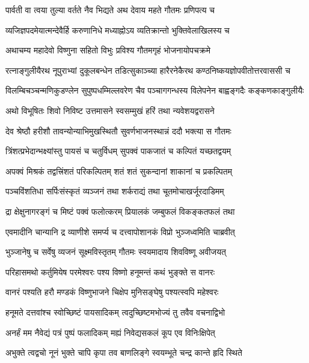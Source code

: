 \twolineshloka
{पार्वती वा त्वया तुल्या वर्तते नैव भिद्यते}
{अथ देवाय महते गौतमः प्रणिपत्य च}%

\twolineshloka
{व्यजिज्ञपदमेयात्मन्देवैर्हि करुणानिधे}
{मध्याह्नोऽय व्यतिक्रान्तो भुक्तिवेलाखिलस्य च}%

\twolineshloka
{अथाचम्य महादेवो विष्णुना सहितो विभुः}
{प्रविश्य गौतमगृहं भोजनायोपचक्रमे}%

\twolineshloka
{रत्नाङ्गुलीयैरथ नूपुराभ्यां दुकूलबन्धेन तडित्सुकाञ्च्या}
{हारैरनेकैरथ कण्ठनिष्कयज्ञोपवीतोत्तरवाससी च}%

\twolineshloka
{विलम्बिचञ्चन्मणिकुडण्लेन सुपुष्पधम्मिल्लवरेण चैव}
{पञ्चागगन्धस्य विलेपनेन बाह्वङ्गदैः कङ्कणकाङ्गुलीयैः}%

\twolineshloka
{अथो विभूषितः शिवो निविष्ट उत्तमासने}
{स्वसम्मुखं हरिं तथा न्यवेशयद्वरासने}%

\twolineshloka
{देव श्रेष्ठौ हरीशौ तावन्योन्याभिमुखस्थितौ}
{सुवर्णभाजनस्थान्नं ददौ भक्त्या स गौतमः}%

\twolineshloka
{त्रिंशत्प्रभेदान्भक्ष्यांस्तु पायसं च चतुर्विधम्}
{सुपक्वं पाकजातं च कल्पितं यच्छतद्वयम्}%

\twolineshloka
{अपक्वं मिश्रकं तद्वत्त्रिंशतं परिकल्पितम्}
{शतं शतं सुकन्दानां शाकानां च प्रकल्पितम्}%

\twolineshloka
{पञ्चविंशतिधा सर्पिःसंस्कृतं व्यञ्जनं तथा}
{शर्कराद्यं तथा चूतमोचाखर्जूरदाडिमम्}%

\twolineshloka
{द्रा क्षेक्षुनागरङ्गं च मिष्टं पक्वं फलोत्करम्}
{प्रियालकं जम्बुफलं विकङ्कतफलं तथा}%

\twolineshloka
{एवमादीनि चान्यानि द्र व्याणीशे समर्प्य च}
{दत्त्वापोशानकं विप्रो भुञ्जध्वमिति चाब्रवीत्}%

\twolineshloka
{भुञ्जानेषु च सर्वेषु व्यजनं सूक्ष्मविस्तृतम्}
{गौतमः स्वयमादाय शिवविष्णू अवीजयत्}%

\twolineshloka
{परिहासमथो कर्तुमियेष परमेश्वरः}
{पश्य विष्णो हनूमन्तं कथं भुङ्क्ते स वानरः}%

\twolineshloka
{वानरं पश्यति हरौ मण्डकं विष्णुभाजने}
{चिक्षेप मुनिसङ्घेषु पश्यत्स्वपि महेश्वरः}%

\twolineshloka
{हनूमते दत्तवांश्च स्वोच्छिष्टं पायसादिकम्}
{त्वदुच्छिष्टमभोज्यं तु तवैव वचनाद्विभो}%

\twolineshloka
{अनर्हं मम नैवेद्यं पत्रं पुष्पं फलादिकम्}
{मह्यं निवेद्यसकलं कूप एव विनिःक्षिपेत्}%

\twolineshloka
{अभुक्ते त्वद्वचो नूनं भुक्ते चापि कृपा तव}
{बाणलिङ्गे स्वयम्भूते चन्द्र कान्ते हृदि स्थिते}%

